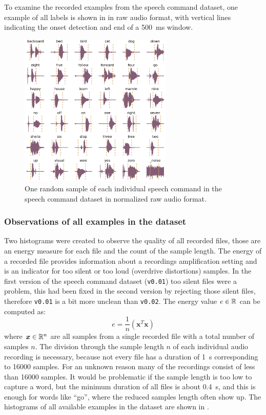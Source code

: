 To examine the recorded examples from the speech command dataset, one example of all labels is shown in  in raw audio format, with vertical lines indicating the onset detection and end of a \SI{500}{\milli\second} window.
\begin{figure}[!ht]
  \centering
    \includegraphics[width=0.65\textwidth]{./5_exp/figs/exp_dataset_speech_cmd_wav_grid.png}
  \caption{One random sample of each individual speech command in the speech command dataset in normalized raw audio format.}
  \label{fig:exp_dataset_speech_cmd_wav_grid}
\end{figure}
\FloatBarrier
\noindent



\subsubsection{Observations of all examples in the dataset}
Two histograms were created to observe the quality of all recorded files, those are an energy measure for each file and the count of the sample length.
The energy of a recorded file provides information about a recordings amplification setting and is an indicator for too silent or too loud (overdrive distortions) samples. 
In the first version of the speech command dataset (\texttt{v0.01}) too silent files were a problem, this had been fixed in the second version by rejecting those silent files, therefore \texttt{v0.01} is a bit more unclean than \texttt{v0.02}.
The energy value $e \in \mathbb{R}$ can be computed as:
\begin{equation}\label{eq:exp_dataset_energy}
  e = \frac{1}{n} \left( \bm{x}^T \bm{x} \right)
\end{equation}
where $\bm{x} \in \mathbb{R}^n$ are all samples from a single recorded file with a total number of samples $n$.
The division through the sample length $n$ of each individual audio recording is necessary, because not every file has a duration of \SI{1}{\second} corresponding to 16000 samples.
For an unknown reason many of the recordings consist of less than 16000 samples.
It would be problematic if the sample length is too low to capture a word, but the minimum duration of all files is about \SI{0.4}{\second}, and this is enough for words like \enquote{go}, where the reduced samples length often show up.
The histograms of all available examples in the dataset are shown in .

